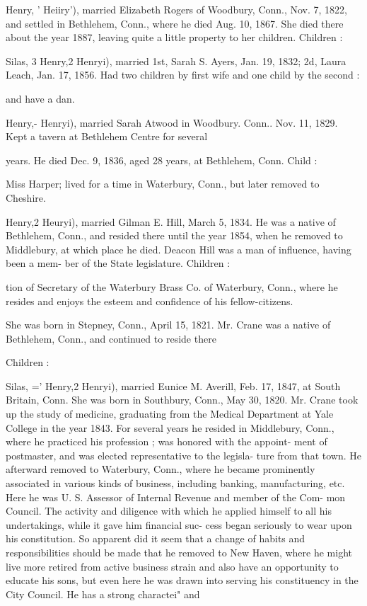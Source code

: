 \documentclass[oneside]{book}
\begin{document}
Henry, ' Heiiry'), married Elizabeth Rogers of Woodbury, Conn., 
Nov. 7, 1822, and settled in Bethlehem, Conn., where he died 
Aug. 10, 1867. She died there about the year 1887, leaving 
quite a little property to her children. Children : 






Silas, 3 Henry,2 Henryi), married 1st, Sarah S. Ayers, Jan. 19, 
1832; 2d, Laura Leach, Jan. 17, 1856. Had two children by 
first wife and one child by the second : 

and have a dan. 

Henry,- Henryi), married Sarah Atwood in Woodbury. Conn.. 
Nov. 11, 1829. Kept a tavern at Bethlehem Centre for several 




years. He died Dec. 9, 1836, aged 28 years, at Bethlehem, 
Conn. Child : 


Miss Harper; lived for a time in Waterbury, Conn., but 
later removed to Cheshire. 

Henry,2 Heuryi), married Gilman E. Hill, March 5, 1834. He 
was a native of Bethlehem, Conn., and resided there until the 
year 1854, when he removed to Middlebury, at which place he 
died. Deacon Hill was a man of influence, having been a mem- 
ber of the State legislature. Children : 



tion of Secretary of the Waterbury Brass Co. of Waterbury, 
Conn., where he resides and enjoys the esteem and confidence 
of his fellow-citizens. 

She was born in Stepney, Conn., April 15, 1821. Mr. Crane 
was a native of Bethlehem, Conn., and continued to reside there 

Children : 







Silas, =' Henry,2 Henryi), married Eunice M. Averill, Feb. 17, 
1847, at South Britain, Conn. She was born in Southbury, 
Conn., May 30, 1820. Mr. Crane took up the study of medicine, 
graduating from the Medical Department at Yale College in the 
year 1843. For several years he resided in Middlebury, Conn., 
where he practiced his profession ; was honored with the appoint- 
ment of postmaster, and was elected representative to the legisla- 
ture from that town. He afterward removed to Waterbury, 
Conn., where he became prominently associated in various kinds 
of business, including banking, manufacturing, etc. Here he 
was U. S. Assessor of Internal Revenue and member of the Com- 
mon Council. The activity and diligence with which he applied 
himself to all his undertakings, while it gave him financial suc- 
cess began seriously to wear upon his constitution. So apparent 
did it seem that a change of habits and responsibilities should be 
made that he removed to New Haven, where he might live more 
retired from active business strain and also have an opportunity 
to educate his sons, but even here he was drawn into serving his 
constituency in the City Council. He has a strong charactei" and 
\end{document}
